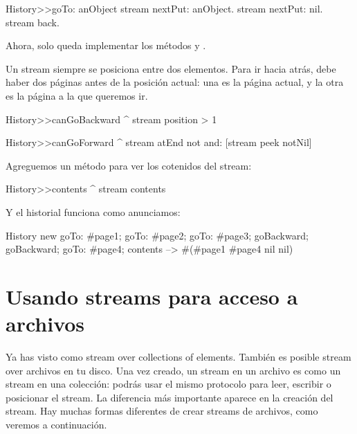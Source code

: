 \documentclass[a4paper,10pt,twoside]{book}
\begin{document}
{\begin{code}{}
History>>goTo: anObject
  stream nextPut: anObject.
  stream nextPut: nil.
  stream back.
\end{code}

Ahora, solo queda implementar los m\'etodos  y .

Un stream siempre se posiciona entre dos elementos. Para ir hacia atr\'as,
debe haber dos p\'aginas antes de la posici\'on actual: una es la p\'agina actual,
y la otra es la p\'agina a la que queremos ir. 

\begin{code}{}
History>>canGoBackward
  ^ stream position > 1

History>>canGoForward
  ^ stream atEnd not and: [stream peek notNil]
\end{code}

Agreguemos un m\'etodo para ver los cotenidos del stream:
\begin{code}{}
History>>contents
  ^ stream contents
\end{code}

Y el historial funciona como anunciamos:
\begin{code}{}
History new
	goTo: #page1;
	goTo: #page2;
	goTo: #page3;
	goBackward;
	goBackward;
	goTo: #page4;
	contents --> #(#page1 #page4 nil nil)
\end{code}

\section{Usando streams para acceso a archivos}

Ya has visto como stream over collections of elements. Tambi\'en es posible
stream over archivos en tu disco. 
Una vez creado, un stream en un archivo es como un stream en una colecci\'on:
podr\'as usar el mismo protocolo para leer, escribir o posicionar el stream.
La diferencia m\'as importante aparece en la creaci\'on del stream.
Hay muchas formas diferentes de crear streams de archivos, como veremos a continuaci\'on.
 
}
\end{document}
